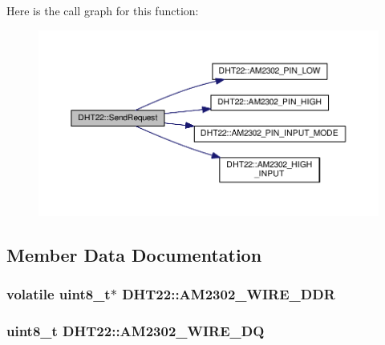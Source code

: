 Here is the call graph for this function\+:\nopagebreak
\begin{figure}[H]
\begin{center}
\leavevmode
\includegraphics[width=350pt]{classDHT22_acf1337337af198d3a6216f625c70cbc7_cgraph}
\end{center}
\end{figure}




\subsection{Member Data Documentation}
\subsubsection[{\texorpdfstring{A\+M2302\+\_\+\+W\+I\+R\+E\+\_\+\+D\+DR}{AM2302_WIRE_DDR}}]{\setlength{\rightskip}{0pt plus 5cm}volatile uint8\+\_\+t$\ast$ D\+H\+T22\+::\+A\+M2302\+\_\+\+W\+I\+R\+E\+\_\+\+D\+DR\hspace{0.3cm}{\ttfamily [private]}}\hypertarget{classDHT22_a69649c4246cd4e255a6e61961b0c948b}{}\label{classDHT22_a69649c4246cd4e255a6e61961b0c948b}
\subsubsection[{\texorpdfstring{A\+M2302\+\_\+\+W\+I\+R\+E\+\_\+\+DQ}{AM2302_WIRE_DQ}}]{\setlength{\rightskip}{0pt plus 5cm}uint8\+\_\+t D\+H\+T22\+::\+A\+M2302\+\_\+\+W\+I\+R\+E\+\_\+\+DQ\hspace{0.3cm}{\ttfamily [private]}}\hypertarget{classDHT22_a4b6de6908e5eb743dec2c254ef89782e}{}\label{classDHT22_a4b6de6908e5eb743dec2c254ef89782e}
